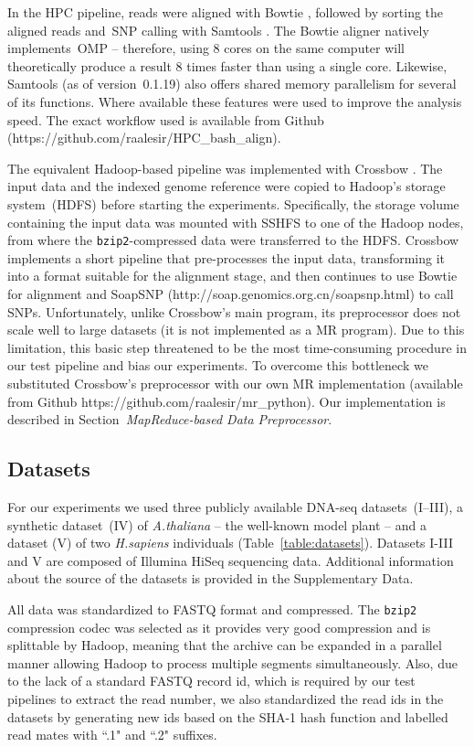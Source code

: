 \documentclass{bioinfo}
\begin{document}
\begin{methods}
In the HPC pipeline, reads were aligned with Bowtie \citep{Langmead:2009uq}, followed by sorting the aligned reads and~SNP calling with Samtools \citep{samtools}. The Bowtie aligner natively implements~OMP -- therefore, using 8 cores on the same computer will theoretically produce a result 8 times faster than using a single core. Likewise, Samtools (as of version~0.1.19) also offers shared memory parallelism for several of its functions. Where available these features were used to improve the analysis speed. The exact workflow used is available from Github (https://github.com/raalesir/HPC\_bash\_align).


The equivalent Hadoop-based pipeline was implemented with Crossbow \citep{Langmead:2009kx}. The input
data and the indexed genome reference were copied to Hadoop's storage
system~(HDFS) before starting the experiments.  Specifically, the storage volume
containing the input data was mounted with SSHFS to one of the Hadoop nodes,
from where the \texttt{bzip2}-compressed data were transferred to the HDFS.
Crossbow implements a short pipeline that pre-processes the input data, transforming it into a format suitable for the alignment stage, and then continues to use Bowtie for alignment and SoapSNP (http://soap.genomics.org.cn/soapsnp.html) to call SNPs.  Unfortunately, unlike Crossbow's main program, its preprocessor does not scale well to large datasets (it is not implemented as a MR program). Due to this limitation, this basic step threatened to be the most time-consuming procedure in our test pipeline and bias our experiments. To overcome this bottleneck we substituted Crossbow's preprocessor with our own MR implementation (available from Github https://github.com/raalesir/mr\_python). Our implementation is described in Section~{\it MapReduce-based Data Preprocessor}.


\subsection*{Datasets}
For our experiments we used three publicly available DNA-seq datasets~(I--III),
a synthetic dataset~(IV) of {\it A.thaliana} -- the well-known model plant --
and a dataset (V) of two {\it H.sapiens} individuals
(Table~\ref{table:datasets}). Datasets I-III and V are composed of Illumina
HiSeq sequencing data. Additional information about the source of the datasets is
provided in the Supplementary Data.

All data was standardized to FASTQ format and compressed. The
\texttt{bzip2} compression codec was selected as it provides very good compression
and is splittable by Hadoop, meaning that the archive can be expanded in a
parallel manner allowing Hadoop to process multiple segments simultaneously.
Also, due to the lack of a standard FASTQ record id, which is
required by our test pipelines to extract the read number, we also standardized
the read ids in the datasets by generating new ids based on the SHA-1 hash
function and labelled read mates with ``.1" and ``.2" suffixes.


\end{methods}
\end{document}
